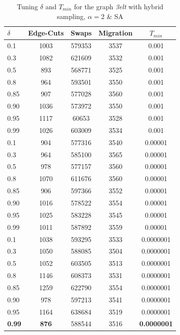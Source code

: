 \documentclass[a4paper, 11pt]{article}
\begin{document}
\begin{table}[H]
		\centering
		\begin{tabular}{|l|c|c|c|c|} 
			\hline
			$\delta$ & Edge-Cuts &  Swaps & Migration & $T_{min}$ \\\hline
			 0.1 & 1003 & 579353 & 3537 & 0.001\\
			0.3 &  1082 & 621609 & 3532 & 0.001\\
			0.5 & 893 & 568771 & 3525 & 0.001 \\
			0.8 & 964 & 593501 & 3550 & 0.001 \\
			 0.85 & 907 & 577028 & 3560 & 0.001 \\
			0.90 & 1036 & 573972 &  3550 & 0.001 \\
			 0.95 & 1117 & 60653 & 3528 & 0.001 \\
			0.99 & 1026 & 603009 &  3534 & 0.001 \\
			 0.1 & 904 & 577316 & 3540 & 0.00001\\
			0.3 & 964 & 585100 &3565 & 0.00001 \\
			 0.5 & 978 & 577157 & 3560 & 0.00001\\
			 0.8 & 1070 & 611676 & 3560 & 0.00001\\
			 0.85 & 906 & 597366 & 3552 & 0.00001\\
			0.90 &  1016 & 578522 & 3554 & 0.00001\\
			0.95 & 1025 & 583228 & 3545 & 0.00001\\ 
			0.99 & 1011 & 587892 & 3559 & 0.00001\\
			 0.1 & 1038 & 593295 & 3533 & 0.0000001\\
			0.3 & 1050 & 588085 & 3504 & 0.0000001\\
			0.5 & 1052 & 603505 & 3513 & 0.0000001\\
			 0.8 & 1146 & 608373 & 3531 & 0.0000001\\
			 0.85 & 1259 & 622790 & 3554 & 0.0000001\\
			 0.90 & 978 & 597213 & 3541 & 0.0000001\\
			0.95 & 1164 & 638684 & 3519 & 0.0000001\\
			\textbf{0.99} & \textbf{876} & 588544 & 3516 & \textbf{0.0000001}\\
			
			\hline
		\end{tabular}
		\caption{Tuning $\delta$ and $T_{min}$ for the graph \textit{3elt} with hybrid sampling, $\alpha=2$ \& SA}
		\label{tab:3elt_delta_1}
	\end{table}
\end{document}
